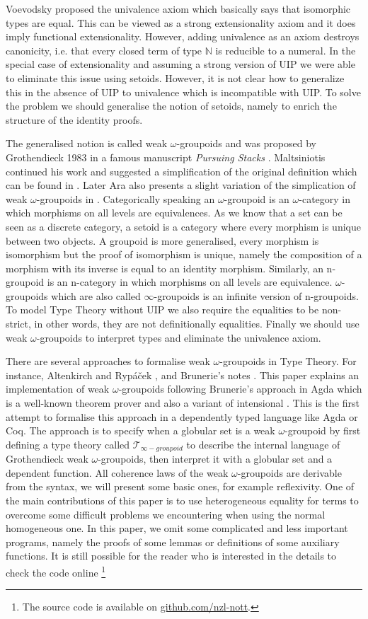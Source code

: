 \documentclass{acm_proc_article-sp}
\newcommand{\og}{$\omega$-groupoids}
\newcommand{\wog}{weak $\omega$-groupoids}
\newcommand{\wogs}{weak $\omega$-groupoid} %
\newcommand{\tig}{$\mathcal{T}_{\infty-groupoid}$}
\begin{document}
Voevodsky proposed the univalence axiom which basically says that
isomorphic types are equal. This can be viewed as a strong
extensionality axiom and it does imply functional extensionality.
However, adding
univalence as an axiom destroys canonicity, i.e. that every closed
term of type $\mathbb{N}$ is reducible to a numeral. In the special case of
extensionality and assuming a strong version of UIP we were able to
eliminate this issue \cite{alti:lics99,alti:ott-conf} using
setoids. However, it is not clear how to generalize this in the
absence of UIP to
univalence which is incompatible with UIP.  To solve the problem we
should generalise the notion of setoids, namely to enrich the
structure of the identity proofs.


The generalised notion is called {\wog} and was proposed by
Grothendieck 1983 in a famous manuscript \emph{Pursuing Stacks} \cite{gro:ps}. Maltsiniotis continued his work and suggested a simplification of the original definition which can be found in \cite{mal:gwog}. Later Ara also presents a slight variation of the simplication of {\wog} in \cite{ara:wog}. Categorically speaking an $\omega$-groupoid is an $\omega$-category in which morphisms on all levels are equivalences. As we know that a set can be seen as a discrete
category, a setoid is a category where every morphism is unique between
two objects. A groupoid is more generalised, every morphism is
isomorphism but the proof of isomorphism is unique, namely the composition of a morphism with its inverse is equal to an identity morphism. Similarly, an
n-groupoid is an n-category in which morphisms on all levels are
equivalence. {\og} which are also called $\infty$-groupoids is an
infinite version of n-groupoids. To model Type Theory without UIP we
also require the equalities to be non-strict, in other words, they are
not definitionally equalities. Finally we should use {\wog} to interpret types and eliminate the univalence axiom.

There are several approaches to formalise {\wog} in Type Theory. For instance, Altenkirch and Ryp\'a\v{c}ek \cite{txa:csl}, and Brunerie's notes \cite{gb:wog}.
This paper explains an implementation of {\wog} following Brunerie's approach in Agda which is a well-known theorem prover and also a variant of intensional {\mltt}. This is the first attempt to formalise this approach in a dependently typed language like Agda or Coq. The approach is to specify when a globular set is a {\wogs} by first defining a type theory called {\tig} to describe the internal language of Grothendieck {\wog}, then interpret it with a globular set and a dependent function. All coherence laws of the {\wog} are derivable from the syntax, we will present some basic ones, for example reflexivity. One of the main contributions of this paper is to use heterogeneous equality for terms to overcome some difficult problems we encountering when using the normal homogeneous one. In this paper, we omit some complicated and less important programs, namely the proofs of some lemmas or definitions of some auxiliary functions. It is still possible for the reader who is interested in the details to check the code online%
\footnote{The source code is available on \url{github.com/nzl-nott}.}
\end{document}
